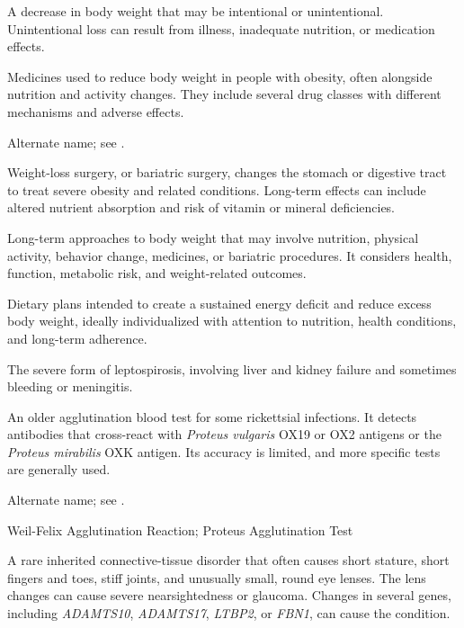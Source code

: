  A decrease in body weight that may be intentional or unintentional. Unintentional loss can result from illness, inadequate nutrition, or medication effects.

 Medicines used to reduce body weight in people with obesity, often alongside nutrition and activity changes. They include several drug classes with different mechanisms and adverse effects.

 Alternate name; see .

 Weight-loss surgery, or bariatric surgery, changes the stomach or digestive tract to treat severe obesity and related conditions. Long-term effects can include altered nutrient absorption and risk of vitamin or mineral deficiencies.

 Long-term approaches to body weight that may involve nutrition, physical activity, behavior change, medicines, or bariatric procedures. It considers health, function, metabolic risk, and weight-related outcomes.

 Dietary plans intended to create a sustained energy deficit and reduce excess body weight, ideally individualized with attention to nutrition, health conditions, and long-term adherence.

 The severe form of leptospirosis, involving liver and kidney failure and sometimes bleeding or meningitis.

 An older agglutination blood test for some rickettsial infections. It detects antibodies that cross-react with \textit{Proteus vulgaris} OX19 or OX2 antigens or the \textit{Proteus mirabilis} OXK antigen. Its accuracy is limited, and more specific tests are generally used.

 Alternate name; see .

\synonyms
Weil-Felix Agglutination Reaction; Proteus Agglutination Test

 A rare inherited connective-tissue disorder that often causes short stature, short fingers and toes, stiff joints, and unusually small, round eye lenses. The lens changes can cause severe nearsightedness or glaucoma. Changes in several genes, including \textit{ADAMTS10}, \textit{ADAMTS17}, \textit{LTBP2}, or \textit{FBN1}, can cause the condition.

